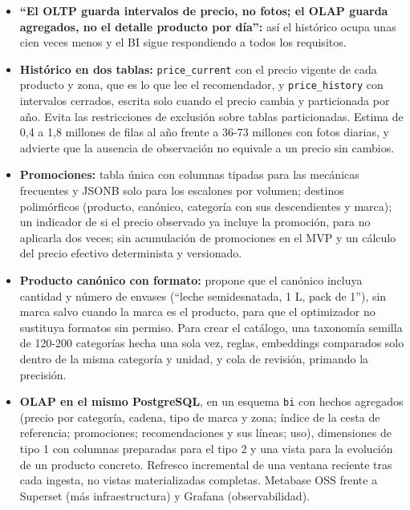 \begin{tcolorbox}[colback=responsecolor, title=Insights de DeepSeek, colframe=gray!60!black, breakable]
	\begin{itemize}
		\item \textbf{``El OLTP guarda intervalos de precio, no fotos; el OLAP guarda agregados, no el detalle producto por día'':} así el histórico ocupa unas cien veces menos y el BI sigue respondiendo a todos los requisitos.

		\item \textbf{Histórico en dos tablas:} \texttt{price\_current} con el precio vigente de cada producto y zona, que es lo que lee el recomendador, y \texttt{price\_history} con intervalos cerrados, escrita solo cuando el precio cambia y particionada por año. Evita las restricciones de exclusión sobre tablas particionadas. Estima de 0,4 a 1,8 millones de filas al año frente a 36-73 millones con fotos diarias, y advierte que la ausencia de observación no equivale a un precio sin cambios.

		\item \textbf{Promociones:} tabla única con columnas tipadas para las mecánicas frecuentes y JSONB solo para los escalones por volumen; destinos polimórficos (producto, canónico, categoría con sus descendientes y marca); un indicador de si el precio observado ya incluye la promoción, para no aplicarla dos veces; sin acumulación de promociones en el MVP y un cálculo del precio efectivo determinista y versionado.

		\item \textbf{Producto canónico con formato:} propone que el canónico incluya cantidad y número de envases (``leche semidesnatada, 1 L, pack de 1''), sin marca salvo cuando la marca es el producto, para que el optimizador no sustituya formatos sin permiso. Para crear el catálogo, una taxonomía semilla de 120-200 categorías hecha una sola vez, reglas, embeddings comparados solo dentro de la misma categoría y unidad, y cola de revisión, primando la precisión.

		\item \textbf{OLAP en el mismo PostgreSQL}, en un esquema \texttt{bi} con hechos agregados (precio por categoría, cadena, tipo de marca y zona; índice de la cesta de referencia; promociones; recomendaciones y sus líneas; uso), dimensiones de tipo 1 con columnas preparadas para el tipo 2 y una vista para la evolución de un producto concreto. Refresco incremental de una ventana reciente tras cada ingesta, no vistas materializadas completas. Metabase OSS frente a Superset (más infraestructura) y Grafana (observabilidad).
	\end{itemize}
\end{tcolorbox}

